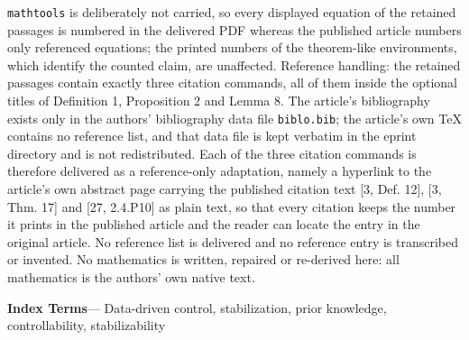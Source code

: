 \documentclass[10pt,a4paper]{amsart}
\newenvironment{IEEEkeywords}{\par\medskip\noindent\textbf{Index Terms}---\ignorespaces}{\par\medskip}
\begin{document}
\texttt{mathtools} is deliberately not carried, so every displayed equation of the retained passages is numbered in the delivered PDF whereas the published article numbers only referenced equations; the printed numbers of the theorem-like environments, which identify the counted claim, are unaffected. Reference handling: the retained passages contain exactly three citation commands, all of them inside the optional titles of Definition 1, Proposition 2 and Lemma 8. The article's bibliography exists only in the authors' bibliography data file \texttt{biblo.bib}; the article's own TeX contains no reference list, and that data file is kept verbatim in the eprint directory and is not redistributed. Each of the three citation commands is therefore delivered as a reference-only adaptation, namely a hyperlink to the article's own abstract page carrying the published citation text [3, Def. 12], [3, Thm. 17] and [27, 2.4.P10] as plain text, so that every citation keeps the number it prints in the published article and the reader can locate the entry in the original article. No reference list is delivered and no reference entry is transcribed or invented. No mathematics is written, repaired or re-derived here: all mathematics is the authors' own native text.
\begin{abstract}
In this work, we study data-driven stabilization of linear time-invariant systems using prior knowledge of system-theoretic properties, specifically stabilizability and controllability. To formalize this, we extend the concept of data informativity by requiring the existence of a controller that stabilizes all systems consistent with the data \emph{and} the prior knowledge. We show that if the system is controllable, then incorporating this as prior knowledge does not relax the conditions required for data-driven stabilization. Remarkably, however, we show that if the system is stabilizable, then using this as prior knowledge leads to necessary and sufficient conditions that are \emph{weaker} than those for data-driven stabilization without prior knowledge. In other words, data-driven stabilization is easier if one knows that the underlying system is stabilizable. We also provide new data-driven control design methods in terms of linear matrix inequalities that complement the conditions for informativity.
\end{abstract}

\begin{IEEEkeywords}
Data-driven control, stabilization, prior knowledge, controllability, stabilizability
\end{IEEEkeywords}
\end{document}
